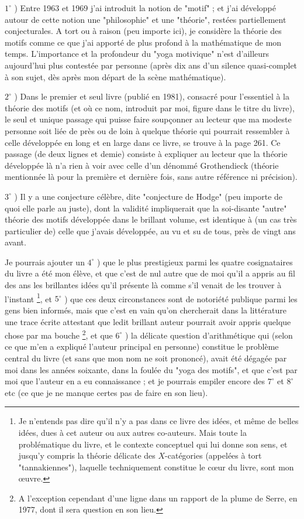 $1^{\circ}$ ) Entre 1963 et 1969 j'ai introduit la notion de "motif" ; et j'ai développé autour de cette notion une "philosophie" et une "théorie", restées partiellement conjecturales. A tort ou à raison (peu importe ici), je considère la théorie des motifs comme ce que j'ai apporté de plus profond à la mathématique de mon temps. L'importance et la profondeur du "yoga motivique" n'est d'ailleurs aujourd'hui plus contestée par personne (après dix ans d'un silence quasi-complet à son sujet, dès après mon départ de la scène mathématique).

$2^{\circ}$ ) Dans le premier et seul livre (publié en 1981), consacré pour l'essentiel à la théorie des motifs (et où ce nom, introduit par moi, figure dans le titre du livre), le seul et unique passage qui puisse faire soupçonner au lecteur que ma modeste personne soit liée de près ou de loin à quelque théorie qui pourrait ressembler à celle développée en long et en large dans ce livre, se trouve à la page 261. Ce passage (de deux lignes et demie) consiste à expliquer au lecteur que la théorie développée là n'a rien à voir avec celle d'un dénommé Grothendieck (théorie mentionnée là pour la première et dernière fois, sans autre référence ni précision).

$3^{\circ}$ ) Il y a une conjecture célèbre, dite "conjecture de Hodge" (peu importe de quoi elle parle au juste), dont la validité impliquerait que la soi-disante "autre" théorie des motifs développée dans le brillant volume, est identique à (un cas très particulier de) celle que j'avais développée, au vu et su de tous, près de vingt ans avant.

Je pourrais ajouter un $4^{\circ}$ ) que le plus prestigieux parmi les quatre cosignataires du livre a été mon élève, et que c'est de nul autre que de moi qu'il a appris au fil des ans les brillantes idées qu'il présente là comme s'il venait de les trouver à l'instant \footnote{Je n'entends pas dire qu'il n'y a pas dans ce livre des idées, et même de belles idées, dues à cet auteur ou aux autres co-auteurs. Mais toute la problématique du livre, et le contexte conceptuel qui lui donne son sens, et jusqu'y compris la théorie délicate des $X$-catégories (appelées à tort "tannakiennes"), laquelle techniquement constitue le cœur du livre, sont mon œuvre.}, et $5^{\circ}$ ) que ces deux circonstances sont de notoriété publique parmi les gens bien informés, mais que c'est en vain qu'on chercherait dans la littérature une trace écrite attestant que ledit brillant auteur pourrait avoir appris quelque chose par ma bouche \footnote{A l'exception cependant d'une ligne dans un rapport de la plume de Serre, en 1977, dont il sera question en son lieu.}, et que $6^{\circ}$ ) la délicate question d'arithmétique qui (selon ce que m'en a expliqué l'auteur principal en personne) constitue le problème central du livre (et sans que mon nom ne soit prononcé), avait été dégagée par moi dans les années soixante, dans la foulée du "yoga des motifs", et que c'est par moi que l'auteur en a eu connaissance ; et je pourrais empiler encore des $7^{\circ}$ et $8^{\circ}$ etc (ce que je ne manque certes pas de faire en son lieu).

